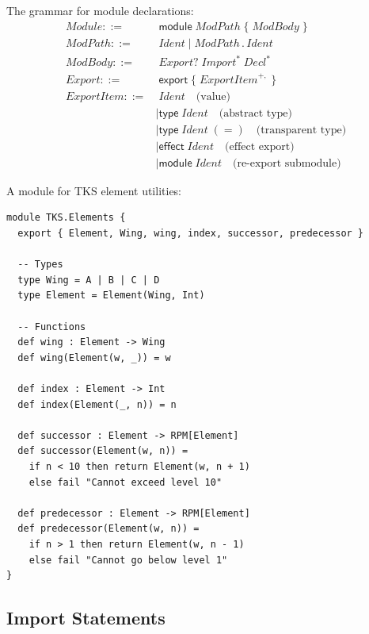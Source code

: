 \begin{definition}
\label{def:module-decl-syntax}
The grammar for module declarations:
\begin{align}
\mathit{Module} ::=&\; \mathsf{module}\; \mathit{ModPath}\; \{\; \mathit{ModBody}\; \} \\
\mathit{ModPath} ::=&\; \mathit{Ident} \mid \mathit{ModPath}\,.\,\mathit{Ident} \\
\mathit{ModBody} ::=&\; \mathit{Export}?\; \mathit{Import}^*\; \mathit{Decl}^* \\
\mathit{Export} ::=&\; \mathsf{export}\; \{\; \mathit{ExportItem}^{+,}\; \} \\
\mathit{ExportItem} ::=&\; \mathit{Ident} \quad \text{(value)} \\
    &\mid \mathsf{type}\; \mathit{Ident} \quad \text{(abstract type)} \\
    &\mid \mathsf{type}\; \mathit{Ident}\; (=) \quad \text{(transparent type)} \\
    &\mid \mathsf{effect}\; \mathit{Ident} \quad \text{(effect export)} \\
    &\mid \mathsf{module}\; \mathit{Ident} \quad \text{(re-export submodule)}
\end{align}
\end{definition}

\begin{example}
\label{ex:basic-module}
A module for TKS element utilities:
\begin{verbatim}
module TKS.Elements {
  export { Element, Wing, wing, index, successor, predecessor }

  -- Types
  type Wing = A | B | C | D
  type Element = Element(Wing, Int)

  -- Functions
  def wing : Element -> Wing
  def wing(Element(w, _)) = w

  def index : Element -> Int
  def index(Element(_, n)) = n

  def successor : Element -> RPM[Element]
  def successor(Element(w, n)) =
    if n < 10 then return Element(w, n + 1)
    else fail "Cannot exceed level 10"

  def predecessor : Element -> RPM[Element]
  def predecessor(Element(w, n)) =
    if n > 1 then return Element(w, n - 1)
    else fail "Cannot go below level 1"
}
\end{verbatim}
\end{example}

\subsection{Import Statements}
\label{subsec:import-statements}


